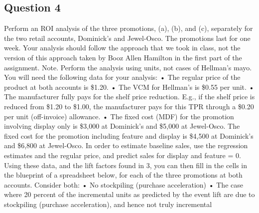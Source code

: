 \documentclass[]{article}
\begin{document}
\hypertarget{question-4}{%
\subsection{Question 4}\label{question-4}}

Perform an ROI analysis of the three promotions, (a), (b), and (c),
separately for the two retail accounts, Dominick's and Jewel-Osco. The
promotions last for one week. Your analysis should follow the approach
that we took in class, not the version of this approach taken by Booz
Allen Hamilton in the first part of the assignment. \newline Note.
Perform the analysis using units, not cases of Hellman's mayo. You will
need the following data for your analysis: \newline • The regular price
of the product at both accounts is \$1.20. \newline • The VCM for
Hellman's is \$0.55 per unit. \newline • The manufacturer fully pays for
the shelf price reduction. E.g., if the shelf price is reduced from
\$1.20 to \$1.00, the manufacturer pays for this TPR through a \$0.20
per unit (off-invoice) allowance. \newline • The fixed cost (MDF) for
the promotion involving display only is \$3,000 at Dominick's and
\$5,000 at Jewel-Osco. The fixed cost for the promotion including
feature and display is \$4,500 at Dominick's and \$6,800 at Jewel-Osco.
\newline In order to estimate baseline sales, use the regression
estimates and the regular price, and predict sales for display and
feature = 0. \newline Using these data, and the lift factors found in 3,
you can then fill in the cells in the blueprint of a spreadsheet below,
for each of the three promotions at both accounts. \newline Consider
both: \newline • No stockpiling (purchase acceleration) \newline • The
case where 20 percent of the incremental units as predicted by the event
lift are due to stockpiling (purchase acceleration), and hence not truly
incremental \newline
\end{document}
